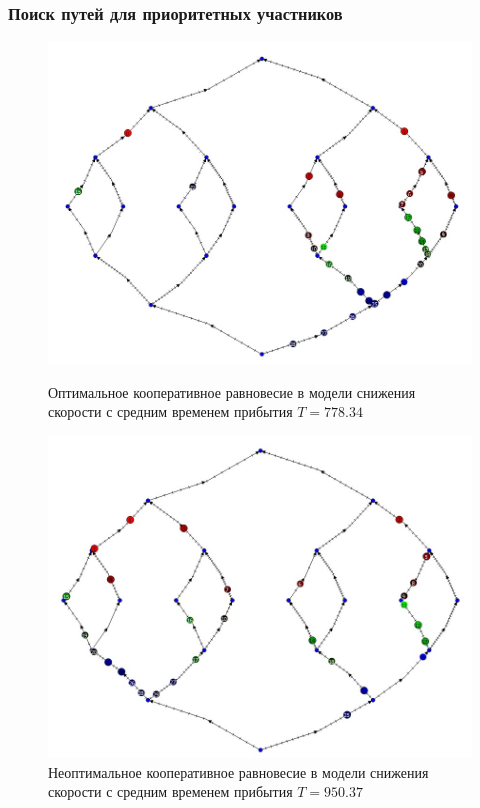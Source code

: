 \documentclass{beamer}
\begin{document}
\begin{frame}\frametitle{Поиск путей для приоритетных участников}
\begin{figure}[H]
	\begin{center}
		\begin{minipage}[h]{0.45\linewidth}
			\includegraphics[width=1\linewidth]{imgs/prior_good.jpg}
			\caption{Оптимальное кооперативное равновесие в модели снижения скорости с средним временем прибытия $T = 778.34$}
		\end{minipage}
		\hfill
		\begin{minipage}[h]{0.45\linewidth}
			\includegraphics[width=1\linewidth]{imgs/prior_bad.jpg}
			\caption{Неоптимальное кооперативное равновесие в модели снижения скорости с средним временем прибытия $T = 950.37$ }
		\end{minipage}
	\end{center}
\end{figure}
\end{frame}
\end{document}
